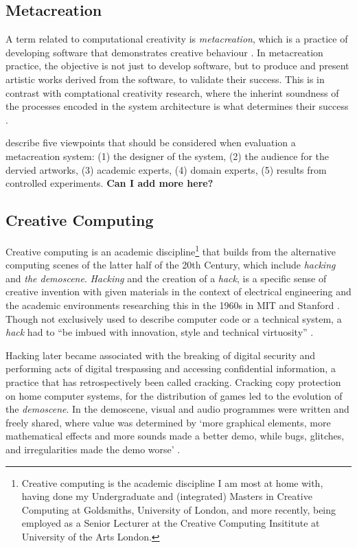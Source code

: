 \subsection{Metacreation}

A term related to computational creativity is \textit{metacreation}, which is a practice of developing software that demonstrates creative behaviour \citep{whitelaw2004metacreation}. 
In metacreation practice, the objective is not just to develop software, but to produce and present artistic works derived from the software, to validate their success. 
This is in contrast with comptational creativity research, where the inherint soundness of the processes encoded in the system architecture is what determines their success \citep{colton2008creativity}.

\cite{eigenfeldt2012evaluating} describe five viewpoints that should be considered when evaluation a metacreation system: (1) the designer of the system, (2) the audience for the dervied artworks, (3) academic experts, (4) domain experts, (5) results from controlled experiments.  
\textbf{Can I add more here?}

\subsection{Creative Computing}

Creative computing is an academic discipline\footnote{Creative computing is the academic discipline I am most at home with, having done my Undergraduate and (integrated) Masters in Creative Computing at Goldsmiths, University of London, and more recently, being employed as a Senior Lecturer at the Creative Computing Insititute at University of the Arts London.}
that builds from the alternative computing scenes of the latter half of the 20th Century, which include  \textit{hacking} and \textit{the demoscene}. 
\textit{Hacking} and the creation of a \textit{hack}, is a specific sense of creative invention with given materials in the context of electrical engineering and the academic environments researching this in the 1960s in MIT and Stanford \citep{wark2006hackers}. 
Though not exclusively used to describe computer code or a technical system, a \textit{hack} had to ``be imbued with innovation, style and technical virtuosity'' \citep{levy1984hackers}.

Hacking later became associated with the breaking of digital security and performing acts of digital trespassing and accessing confidential information, a practice that has retrospectively been called cracking. 
Cracking copy protection on home computer systems, for the distribution of games led to the evolution of the \textit{demoscene}. In the demoscene,  visual and audio programmes were written and freely shared, where value was determined by ‘more graphical elements, more mathematical effects and more sounds made a better demo, while bugs, glitches, and irregularities made the demo worse’ \citep{carlsson2019forgotten}.


